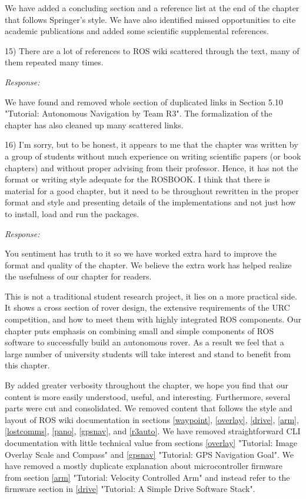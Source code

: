 \documentclass[runningheads,a4paper]{llncs}
\newcommand{\rsp}{\noindent \textit{Response:}}
\begin{document}
We have added a concluding section and a reference list at the end of the chapter that follows Springer's style. We have also identified missed opportunities to cite academic publications and added some scientific supplemental references.

15) There are a lot of references to ROS wiki scattered through the text, many of them repeated many times.

\rsp

We have found and removed whole section of duplicated links in Section 5.10 "Tutorial: Autonomous Navigation by Team R3". The formalization of the chapter has also cleaned up many scattered links.

16) I'm sorry, but to be honest, it appears to me that the chapter was written by a group of students without much experience on writing scientific papers (or book chapters) and without proper advising from their professor.  Hence, it has not the format or writing style adequate for the ROSBOOK.  I think that there is material for a good chapter, but it need to be throughout rewritten in the proper format and style and presenting details of the implementations and not just how to install, load and run the packages.

\rsp

You sentiment has truth to it so we have worked extra hard to improve the format and quality of the chapter. We believe the extra work has helped realize the usefulness of our chapter for readers. 

This is not a traditional student research project, it lies on a more practical side. It shows a cross section of rover design, the extensive requirements of the URC competition, and how to meet them with highly integrated ROS components. Our chapter puts emphasis on combining small and simple components of ROS software to successfully build an autonomous rover. As a result we feel that a large number of university students will take interest and stand to benefit from this chapter.

By added greater verbosity throughout the chapter, we hope you find that our content is more easily understood, useful, and interesting. Furthermore, several parts were cut and consolidated. We removed content that follows the style and layout of ROS wiki documentation in sections \ref{waypoint}, \ref{overlay}, \ref{drive}, \ref{arm}, \ref{lostcomms}, \ref{pano}, \ref{gpsnav}, and \ref{r3auto}. We have removed straightforward CLI documentation with little technical value from sections \ref{overlay} "Tutorial: Image Overlay Scale and Compass" and \ref{gpsnav} "Tutorial: GPS Navigation Goal". We have removed a mostly duplicate explanation about microcontroller firmware from section \ref{arm} "Tutorial: Velocity Controlled Arm" and instead refer to the firmware section in \ref{drive} "Tutorial: A Simple Drive Software Stack".
\end{document}
